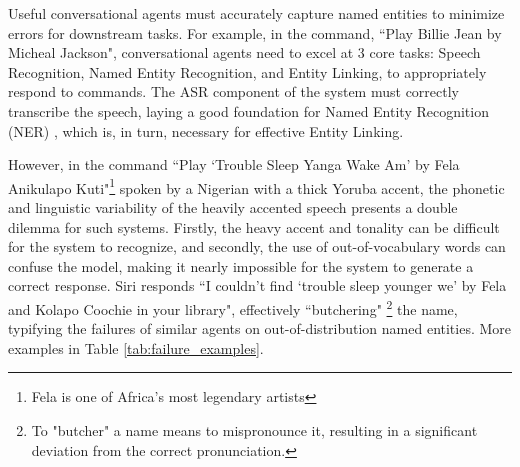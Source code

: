 \documentclass{INTERSPEECH2023}
\begin{document}

Useful conversational agents must accurately capture named entities to minimize errors for downstream tasks. For example, in the command, ``Play Billie Jean by Micheal Jackson", conversational agents need to excel at 3 core tasks: Speech Recognition, Named Entity Recognition, and Entity Linking, to appropriately respond to commands. The ASR component of the system must correctly transcribe the speech, laying a good foundation for Named Entity Recognition (NER) \cite{Nguyen_Yu}, which is, in turn, necessary for effective Entity Linking. 

However, in the command ``Play `Trouble Sleep Yanga Wake Am' by Fela Anikulapo Kuti"\footnote{Fela is one of Africa's most legendary artists} spoken by a Nigerian with a thick Yoruba accent, the phonetic and linguistic variability of the heavily accented speech presents a double dilemma for such systems. Firstly, the heavy accent and tonality can be difficult for the system to recognize, and secondly, the use of out-of-vocabulary words can confuse the model, making it nearly impossible for the system to generate a correct response. Siri responds ``I couldn't find `trouble sleep younger we' by Fela and Kolapo Coochie in your library", effectively ``butchering" \footnote{To "butcher" a name means to mispronounce it, resulting in a significant deviation from the correct pronunciation.} the name, typifying the failures of similar agents on out-of-distribution named entities. More examples in Table \ref{tab:failure_examples}.
\end{document}
